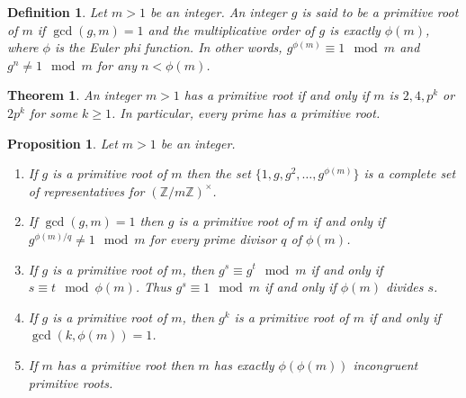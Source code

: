 \documentclass[12pt]{article}
\newtheorem*{thm}{Theorem}
\newtheorem*{defn}{Definition}
\newtheorem*{prop}{Proposition}
\theoremstyle{definition}
\newcommand{\Ints}{\mathbb{Z}}
\begin{document}
\begin{defn}
Let $m>1$ be an integer. An integer $g$ is said to be a primitive root of $m$ if $\gcd(g,m)=1$ and the multiplicative order of $g$ is exactly $\phi(m)$, where $\phi$ is the Euler phi function. In other words, $g^{\phi(m)}\equiv 1 \mod m$ and $g^n\neq 1 \mod m$ for any $n<\phi(m)$.
\end{defn}

\begin{thm}
An integer $m>1$ has a primitive root if and only if $m$ is $2,4,p^k$ or $2p^k$ for some $k\geq 1$. In particular, every prime has a primitive root.
\end{thm}

\begin{prop}
Let $m>1$ be an integer.
\begin{enumerate}
\item If $g$ is a primitive root of $m$ then the set $\{1,g,g^2,\ldots,g^{\phi(m)}\}$ is a complete set of representatives for $(\Ints/m\Ints)^\times$.

\item If $\gcd(g,m)=1$ then $g$ is a primitive root of $m$ if and only if $g^{\phi(m)/q}\neq 1 \mod m$ for every prime divisor $q$ of $\phi(m)$.

\item If $g$ is a primitive root of $m$, then $g^s\equiv g^t \mod m$ if and only if $s\equiv t \mod \phi(m)$. Thus $g^s\equiv 1 \mod m$ if and only if $\phi(m)$ divides $s$.

\item If $g$ is a primitive root of $m$, then $g^k$ is a primitive root of $m$ if and only if $\gcd(k,\phi(m))=1$.

\item If $m$ has a primitive root then $m$ has exactly $\phi(\phi(m))$ incongruent primitive roots.
\end{enumerate}
\end{prop}
\end{document}
